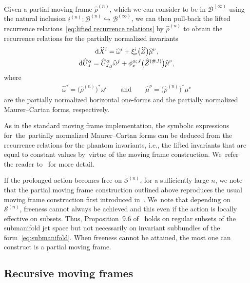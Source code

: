 \documentclass[10pt,a4paper]{amsart}
\numberwithin{equation}{section}
\newcommand{\B}{\mathcal{B}}
\newcommand{\n}{^{(n)}}
\newcommand{\mS}{\mathcal{S}}
\begin{document}
Given a partial moving frame $\widehat{\rho}\n$, which we can consider to be in $\B^{(\infty)}$ using the natural inclusion $i\n\colon \B\n \hookrightarrow \B^{(\infty)}$, we can then pull-back the lifted recurrence relations~\eqref{eq:lifted recurrence relations} by $\widehat{\rho}\n$ to obtain the recurrence relations for the partially normalized invariants
%
\begin{gather*}
{\rm d}\widehat{X}^i = \widehat{\omega}^i + \xi^i_\nu\big(\widehat{Z}\big) \widehat{\mu}^\nu,
\\
{\rm d}\widehat{U}^\alpha_{J} = \widehat{U}_{J,j}^\alpha \widehat{\omega}^j + \phi^{\alpha;J}_\nu\big(\widehat{Z}^{(\#J)}\big) \widehat{\mu}^\nu,
\end{gather*}
%
where
%
\begin{gather*}
\widehat{\omega}^i = \big(\widehat{\rho}\n\big)^*\omega^i\qquad\text{and}\qquad
\widehat{\mu}^\nu = \big(\widehat{\rho}\n\big)^*\mu^\nu
\end{gather*}
are the partially normalized horizontal one-forms and the partially normalized Maurer--Cartan forms, respectively.

\begin{Remark}
As in the standard moving frame implementation, the symbolic expressions for~the~par\-tially normalized Maurer--Cartan forms can be deduced from the recurrence relations for the phantom invariants, i.e., the lifted invariants that are equal to constant values by~vir\-tue of the moving frame construction. We~refer the reader to~\cite{FO-1999} for more detail.
\end{Remark}

\begin{Remark}
If the prolonged action becomes free on $\mS\n$, for a sufficiently large $n$, we note that the partial moving frame construction outlined above reproduces the usual moving frame construction first introduced in~\cite{FO-1999}. We~note that depending on~$\mS\n$, freeness cannot always be achieved and this even if the action is locally effective on subsets. Thus, Proposition~9.6 of~\cite{FO-1999} holds on regular subsets of the submanifold jet space but not necessarily on invariant subbundles of the form~\eqref{eq:submanifold}. When freeness cannot be attained, the most one can construct is a partial moving frame.
\end{Remark}

\subsection{Recursive moving frames}
\end{document}
